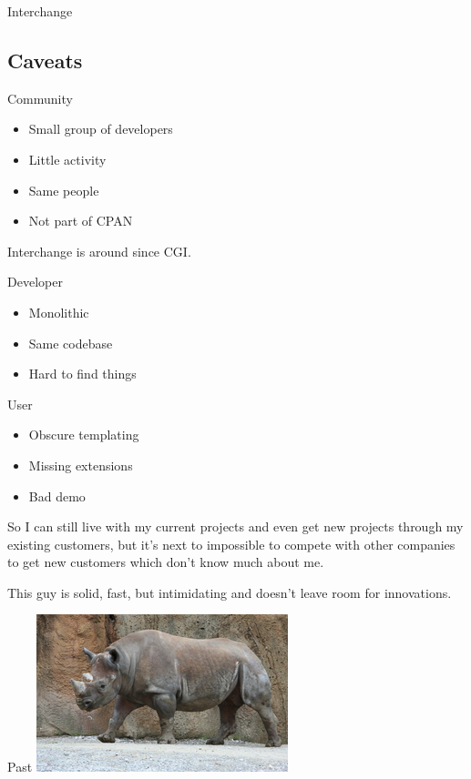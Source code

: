 \begin{frame}{Interchange}
\end{frame}


\subsection{Caveats}

\begin{frame}{Community}
\begin{itemize}
\item Small group of developers
\item Little activity
\item Same people
\item Not part of CPAN
\end{itemize}
\end{frame}

Interchange is around since CGI.

\begin{frame}{Developer}
\begin{itemize}
\item Monolithic
\item Same codebase
\item Hard to find things
\end{itemize}
\end{frame}

\begin{frame}{User}
\begin{itemize}
\item Obscure templating
\item Missing extensions
\item Bad demo
\end{itemize}
\end{frame}

So I can still live with my current projects and even get
new projects through my existing customers, but it's next
to impossible to compete with other companies to get
new customers which don't know much about me.

This guy is solid, fast, but intimidating and
doesn't leave room for innovations.

\begin{frame}{Past}
  \includegraphics{rhino.jpg}
\end{frame}

